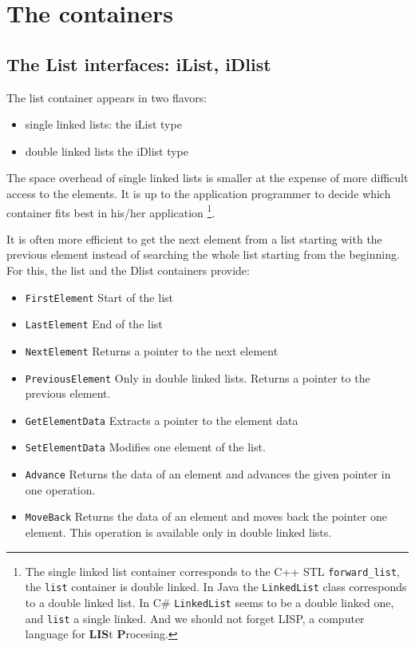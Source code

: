 \documentclass[12pt,a4paper]{memoir} %
\newif\iftth
\newenvironment{ShorterItemize}{
\begin{itemize}
\iftth\else
  \setlength{\itemsep}{1pt}
  \setlength{\parskip}{0pt}
  \setlength{\parsep}{0pt}
\fi
}{\end{itemize}
}
\newcommand{\container}{}
\begin{document}
\chapter{The containers}
\renewcommand{\container}{List}
\section{The List interfaces: iList, iDlist}
The list container appears in two flavors: 
\begin{itemize}
\item
single linked lists: the iList type
\item
double linked lists the iDlist type
\end{itemize}
The space overhead of single linked lists is smaller at the expense of more difficult access to the elements. It is up to the application programmer to decide which container fits best in his/her application
\footnote{
The single linked list container corresponds to the C++ STL \texttt{forward\_list}, the \texttt{list} container is double linked. In Java the \texttt{LinkedList} class corresponds to a double linked list. In C\# \texttt{LinkedList}  seems to be a double linked one, and \texttt{list} a single linked. And we should not forget LISP, a computer language for \textbf{LIS}t \textbf{P}rocesing.
}.

It is often more efficient to get the next element from a list starting with the previous element instead of searching the whole list starting from the beginning. For this, the list and the Dlist containers provide:
\begin{ShorterItemize}
\item \verb,FirstElement, Start of the list
\item \verb,LastElement, End of the list
\item \verb,NextElement, Returns a pointer to the next element
\item \verb,PreviousElement, Only in double linked lists. Returns a pointer to the previous element.
\item \verb,GetElementData, Extracts a pointer to the element data 
\item \verb,SetElementData, Modifies one element of the list.
\item \verb,Advance, Returns the data of an element and advances the given pointer in one operation.
\item \verb,MoveBack, Returns the data of an element and moves back the pointer one element. This operation is available only in double linked lists.
\end{ShorterItemize}
\end{document}

